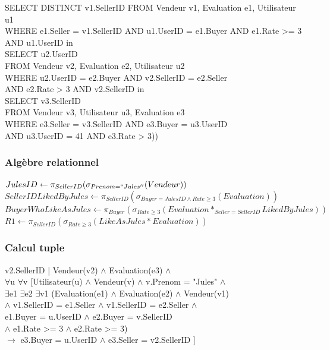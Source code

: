 \documentclass[a4paper,11pt]{article}
\begin{document}
SELECT DISTINCT v1.SellerID
FROM Vendeur v1, Evaluation e1, Utilisateur u1\\
WHERE e1.Seller = v1.SellerID AND u1.UserID = e1.Buyer AND e1.Rate >= 3 AND u1.UserID in \\
\indent \indent SELECT u2.UserID \\
\indent \indent FROM Vendeur v2, Evaluation e2, Utilisateur u2 \\
\indent \indent WHERE u2.UserID = e2.Buyer AND v2.SellerID = e2.Seller \\
\indent \indent AND e2.Rate > 3 AND v2.SellerID in \\
\indent \indent \indent \indent SELECT v3.SellerID\\
\indent \indent \indent \indent FROM Vendeur v3, Utilisateur u3, Evaluation e3\\
\indent \indent \indent \indent WHERE e3.Seller = v3.SellerID AND e3.Buyer = u3.UserID\\
\indent \indent \indent \indent AND u3.UserID = 41 AND e3.Rate > 3))

\subsubsection{Algèbre relationnel}

$JulesID \leftarrow \pi_{SellerID} ( \sigma_{Prenom=``Jules''} (Vendeur)) $ \\
$SellerIDLikedByJules \leftarrow \pi_{SellerID}(\sigma_{Buyer=JulesID \wedge Rate \geq 3} (Evaluation))$\\
$BuyerWhoLikeAsJules \leftarrow \pi_{Buyer}(\sigma_{Rate \geq 3}(Evaluation *_{Seller=SellerID} LikedByJules))$\\
$R1 \leftarrow \pi_{SellerID}(\sigma_{Rate \geq 3}(LikeAsJules*Evaluation))$

\subsubsection{Calcul tuple}

v2.SellerID | Vendeur(v2) $\land$ Evaluation(e3) $\land$\\
$\forall$u $\forall$v [Utilisateur(u) $\land$ Vendeur(v) $\land$ v.Prenom = "Jules" $\land$ \\
$\exists$e1 $\exists$e2 $\exists$v1 (Evaluation(e1) $\land$ Evaluation(e2) $\land$ Vendeur(v1) \\
$\land$ v1.SellerID = e1.Seller $\land$ v1.SellerID = e2.Seller $\land$ \\
e1.Buyer = u.UserID $\land$ e2.Buyer = v.SellerID \\
$\land$ e1.Rate >= 3 $\land$ e2.Rate >= 3) \\
$\rightarrow$ e3.Buyer = u.UserID $\land$ e3.Seller = v2.SellerID ]
\end{document}
